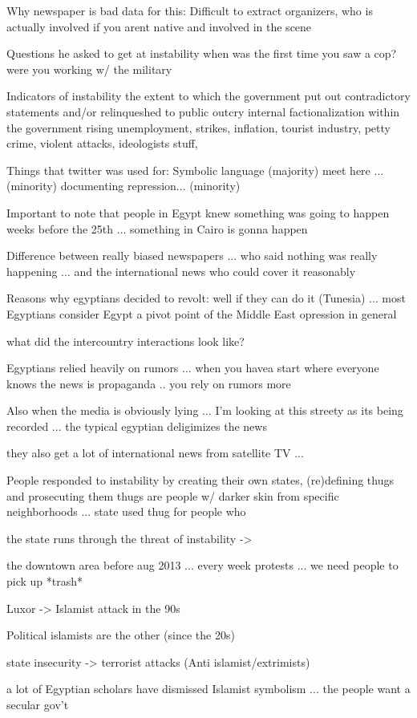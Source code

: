 Why newspaper is bad data for this: 
    Difficult to extract organizers, who is actually involved if you arent native and involved in the scene

Questions he asked to get at instability
		when was the first time you saw a cop?
		were you working w/ the military

Indicators of instability
        the extent to which the government put out contradictory statements and/or relinqueshed to public outcry
		internal factionalization within the government
		rising unemployment, strikes, inflation, tourist industry, petty crime, violent attacks, ideologists stuff, 



Things that twitter was used for:
    Symbolic language (majority)
	meet here ... (minority)
    documenting repression... (minority)

Important to note that people in Egypt knew something was going to happen weeks before the 25th ... something in Cairo is gonna happen 

Difference between really biased newspapers ... who said nothing was really happening ... and the international news who could cover it reasonably

Reasons why egyptians decided to revolt:
    well if they can do it (Tunesia) ... most Egyptians consider Egypt a pivot point of the Middle East 
    opression in general

what did the intercountry interactions look like?

Egyptians relied heavily on rumors ... when you havea  start where everyone knows the news is propaganda .. you rely on rumors more  

    Also when the media is obviously lying ... I'm looking at this streety as its being recorded ... the typical egyptian deligimizes the news

	they also get a lot of international news from satellite TV ... 


People responded to instability by creating their own states, (re)defining thugs and prosecuting them
    thugs are people w/ darker skin from specific neighborhoods ... state used thug for people who 

the state runs through the threat of instability -> 	
    
		the downtown area before aug 2013 ... every week protests ...  we need people to pick up *trash*

		Luxor -> Islamist attack in the 90s

		Political islamists are the other  (since the 20s)

		state insecurity -> terrorist attacks (Anti islamist/extrimists)	

a lot of Egyptian scholars have dismissed Islamist symbolism  ... the people want a secular gov't


